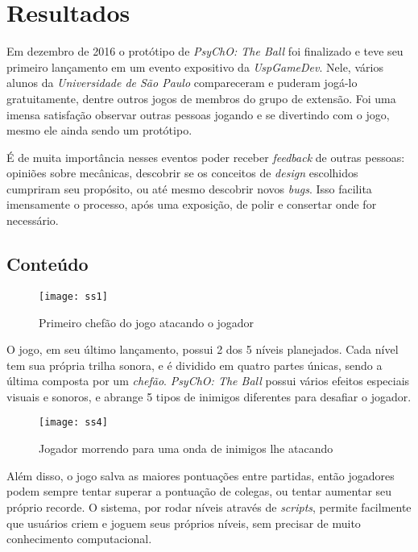 \chapter{Resultados}
\label{cap:resultados}

Em dezembro de 2016 o protótipo de \textit{PsyChO: The Ball} foi finalizado e teve seu primeiro lançamento em um evento expositivo da \textit{UspGameDev}. Nele, vários alunos da \textit{Universidade de São Paulo} compareceram e puderam jogá-lo gratuitamente, dentre outros jogos de membros do grupo de extensão. Foi uma imensa satisfação observar outras pessoas jogando e se divertindo com o jogo, mesmo ele ainda sendo um protótipo.

É de muita importância nesses eventos poder receber \textit{feedback} de outras pessoas: opiniões sobre mecânicas, descobrir se os conceitos de \textit{design} escolhidos cumpriram seu propósito, ou até mesmo descobrir novos \textit{bugs}. Isso facilita imensamente o processo, após uma exposição, de polir e consertar onde for necessário.

\section{Conteúdo}
\label{sec:conteudo}

\begin{figure}[h!]
\texttt{[image: ss1]}
\centering
\caption{Primeiro chefão do jogo atacando o jogador}
\end{figure}

O jogo, em seu último lançamento, possui 2 dos 5 níveis planejados. Cada nível tem sua própria trilha sonora, e é dividido em quatro partes únicas, sendo a última composta por um \textit{chefão}. \textit{PsyChO: The Ball} possui vários efeitos especiais visuais e sonoros, e abrange 5 tipos de inimigos diferentes para desafiar o jogador.

\begin{figure}[h!]
\texttt{[image: ss4]}
\centering
\caption{Jogador morrendo para uma onda de inimigos lhe atacando}
\end{figure}

Além disso, o jogo salva as maiores pontuações entre partidas, então jogadores podem sempre tentar superar a pontuação de colegas, ou tentar aumentar seu próprio recorde. O sistema, por rodar níveis através de \textit{scripts}, permite facilmente que usuários criem e joguem seus próprios níveis, sem precisar de muito conhecimento computacional.

